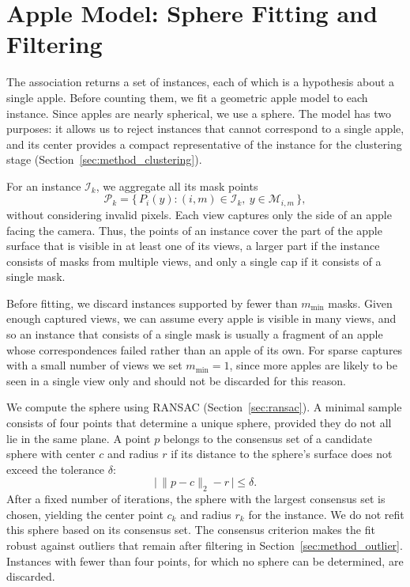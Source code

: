\documentclass[english, egger, bsc]{vcethesis}
\begin{document}
\section{Apple Model: Sphere Fitting and Filtering}
\label{sec:method_sphere}
The association returns a set of instances, each of which is a hypothesis about a single apple. Before counting them, we fit a geometric apple model to each instance. Since apples are nearly spherical, we use a sphere. The model has two purposes: it allows us to reject instances that cannot correspond to a single apple, and its center provides a compact representative of the instance for the clustering stage (Section~\ref{sec:method_clustering}).

For an instance $\mathcal{I}_k$, we aggregate all its mask points
\begin{equation}
    \label{eq:instance_points}
    \mathcal{P}_k = \{\, P_i(y) : (i,m) \in \mathcal{I}_k,\
    y \in \mathcal{M}_{i,m} \,\},
\end{equation}
without considering invalid pixels. Each view captures only the side of an apple facing the camera. Thus, the points of an instance cover the part of the apple surface that is visible in at least one of its views, a larger part if the instance consists of masks from multiple views, and only a single cap if it consists of a single mask.

Before fitting, we discard instances supported by fewer than $m_{\min}$ masks. Given enough captured views, we can assume every apple is visible in many views, and so an instance that consists of a single mask is usually a fragment of an apple whose correspondences failed rather than an apple of its own. For sparse captures with a small number of views we set $m_{\min} = 1$, since more apples are likely to be seen in a single view only and should not be discarded for this reason.

We compute the sphere using RANSAC (Section~\ref{sec:ransac}). A minimal sample consists of four points that determine a unique sphere, provided they do not all lie in the same plane. A point $p$ belongs to the consensus set of a candidate sphere with center $c$ and radius $r$ if its distance to the sphere's surface does not exceed the tolerance $\delta$:
\begin{equation}
    \label{eq:sphere_inlier}
    \bigl|\, \lVert p - c \rVert_2 - r \,\bigr| \leq \delta .
\end{equation}
After a fixed number of iterations, the sphere with the largest consensus set is chosen, yielding the center point $c_k$ and radius $r_k$ for the instance. We do not refit this sphere based on its consensus set. The consensus criterion makes the fit robust against outliers that remain after filtering in Section~\ref{sec:method_outlier}. Instances with fewer than four points, for which no sphere can be determined, are discarded.
\end{document}
